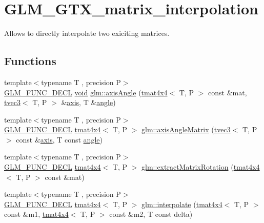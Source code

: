 \hypertarget{group__gtx__matrix__interpolation}{}\section{G\+L\+M\+\_\+\+G\+T\+X\+\_\+matrix\+\_\+interpolation}
\label{group__gtx__matrix__interpolation}


Allows to directly interpolate two exiciting matrices.  


\subsection*{Functions}
\begin{DoxyCompactItemize}
\item 
{\footnotesize template$<$typename T , precision P$>$ }\\\mbox{\hyperlink{setup_8hpp_ab2d052de21a70539923e9bcbf6e83a51}{G\+L\+M\+\_\+\+F\+U\+N\+C\+\_\+\+D\+E\+CL}} \mbox{\hyperlink{glad_8h_a950fc91edb4504f62f1c577bf4727c29}{void}} \mbox{\hyperlink{group__gtx__matrix__interpolation_ga9aef292eb5f29bdbb58a53ef4281af92}{glm\+::axis\+Angle}} (\mbox{\hyperlink{structglm_1_1tmat4x4}{tmat4x4}}$<$ T, P $>$ const \&mat, \mbox{\hyperlink{structglm_1_1tvec3}{tvec3}}$<$ T, P $>$ \&\mbox{\hyperlink{group__gtc__quaternion_ga0b3e87a13b2708154b72259e50789a19}{axis}}, T \&\mbox{\hyperlink{group__gtc__quaternion_gad4a4448baedb198b2b1e7880d2544dc9}{angle}})
\item 
{\footnotesize template$<$typename T , precision P$>$ }\\\mbox{\hyperlink{setup_8hpp_ab2d052de21a70539923e9bcbf6e83a51}{G\+L\+M\+\_\+\+F\+U\+N\+C\+\_\+\+D\+E\+CL}} \mbox{\hyperlink{structglm_1_1tmat4x4}{tmat4x4}}$<$ T, P $>$ \mbox{\hyperlink{group__gtx__matrix__interpolation_ga82d4bc058e9628cb2ea1d4e117a0cf39}{glm\+::axis\+Angle\+Matrix}} (\mbox{\hyperlink{structglm_1_1tvec3}{tvec3}}$<$ T, P $>$ const \&\mbox{\hyperlink{group__gtc__quaternion_ga0b3e87a13b2708154b72259e50789a19}{axis}}, T const \mbox{\hyperlink{group__gtc__quaternion_gad4a4448baedb198b2b1e7880d2544dc9}{angle}})
\item 
{\footnotesize template$<$typename T , precision P$>$ }\\\mbox{\hyperlink{setup_8hpp_ab2d052de21a70539923e9bcbf6e83a51}{G\+L\+M\+\_\+\+F\+U\+N\+C\+\_\+\+D\+E\+CL}} \mbox{\hyperlink{structglm_1_1tmat4x4}{tmat4x4}}$<$ T, P $>$ \mbox{\hyperlink{group__gtx__matrix__interpolation_ga6b8170aa4cf43caf81400696ebb38afe}{glm\+::extract\+Matrix\+Rotation}} (\mbox{\hyperlink{structglm_1_1tmat4x4}{tmat4x4}}$<$ T, P $>$ const \&mat)
\item 
{\footnotesize template$<$typename T , precision P$>$ }\\\mbox{\hyperlink{setup_8hpp_ab2d052de21a70539923e9bcbf6e83a51}{G\+L\+M\+\_\+\+F\+U\+N\+C\+\_\+\+D\+E\+CL}} \mbox{\hyperlink{structglm_1_1tmat4x4}{tmat4x4}}$<$ T, P $>$ \mbox{\hyperlink{group__gtx__matrix__interpolation_ga45099a92c5c704503565619ac2bcd5c6}{glm\+::interpolate}} (\mbox{\hyperlink{structglm_1_1tmat4x4}{tmat4x4}}$<$ T, P $>$ const \&m1, \mbox{\hyperlink{structglm_1_1tmat4x4}{tmat4x4}}$<$ T, P $>$ const \&m2, T const delta)
\end{DoxyCompactItemize}



